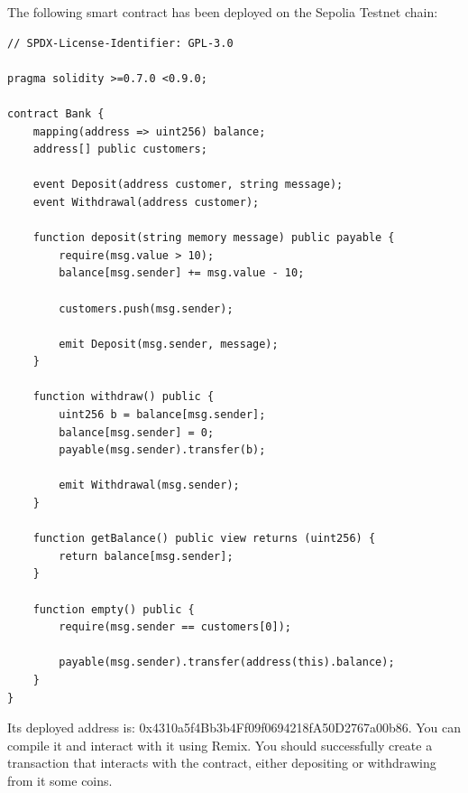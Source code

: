 \documentclass[12pt,addpoints,answers]{exam}
\begin{document}
\begin{questions}
\begin{verbatim}
\end{verbatim}

\newpage
  
\question The following smart contract has been deployed on the Sepolia Testnet chain:

{\footnotesize

\begin{verbatim}
// SPDX-License-Identifier: GPL-3.0

pragma solidity >=0.7.0 <0.9.0;

contract Bank {
    mapping(address => uint256) balance;
    address[] public customers;

    event Deposit(address customer, string message);
    event Withdrawal(address customer);

    function deposit(string memory message) public payable {
        require(msg.value > 10);
        balance[msg.sender] += msg.value - 10;

        customers.push(msg.sender);

        emit Deposit(msg.sender, message);
    }

    function withdraw() public {
        uint256 b = balance[msg.sender];
        balance[msg.sender] = 0;
        payable(msg.sender).transfer(b);

        emit Withdrawal(msg.sender);
    }

    function getBalance() public view returns (uint256) {
        return balance[msg.sender];
    }
    
    function empty() public {
        require(msg.sender == customers[0]);
        
        payable(msg.sender).transfer(address(this).balance);
    }
}
\end{verbatim}

} %

 Its deployed address is: 0x4310a5f4Bb3b4Ff09f0694218fA50D2767a00b86. You can compile it and interact with it using Remix. You should successfully create a transaction that interacts with the contract, either depositing or withdrawing from it some coins. 
 
\end{questions}
\end{document}
